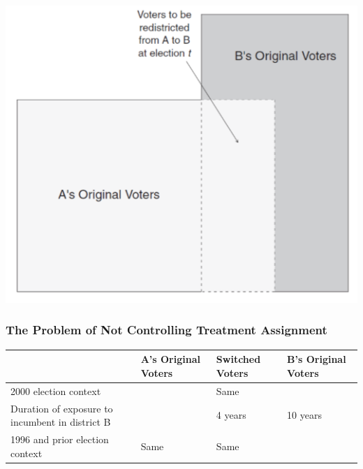\documentclass[xcolor=x11names,compress]{beamer}\usepackage[]{graphicx}\usepackage[]{color}
\renewcommand{\(}{\begin{columns}}
\renewcommand{\)}{\end{columns}}
\newcommand{\<}[1]{\begin{column}{#1}}
\renewcommand{\>}{\end{column}}
\begin{document}
\begin{frame}
\includegraphics[scale=0.36]{Sekhon_redistricting_a.png}
\end{frame}

\begin{frame}
\frametitle{The Problem of Not Controlling Treatment Assignment}
\footnotesize
\begin{table}[htbp]
  \centering
    \begin{tabular}{|p{3cm}|p{2.4cm}|p{2.4cm}|p{2.4cm}|}
    \hline
          & \textbf{A's Original Voters} & \textbf{Switched Voters} & \multicolumn{1}{p{2.4cm}}{\textbf{B's Original Voters}} \bigstrut\\
    \hline
    2000 election context &       & \cellcolor[rgb]{ .776,  .878,  .706}Same  & \cellcolor[rgb]{ .776,  .878,  .706}\multicolumn{1}{p{2.4cm}}{Same} \bigstrut\\
    \hline
    Duration of exposure to incumbent in district B &       & 4 years & \multicolumn{1}{p{2.4cm}}{10 years} \bigstrut\\
    \hline
    1996 and prior election context & \cellcolor[rgb]{ .776,  .878,  .706}Same  & \cellcolor[rgb]{ .776,  .878,  .706}Same  &  \bigstrut\\
    \hline
    \end{tabular}%
  \label{tab:addlabel}%
\end{table}
\normalsize
\end{frame}
\end{document}
